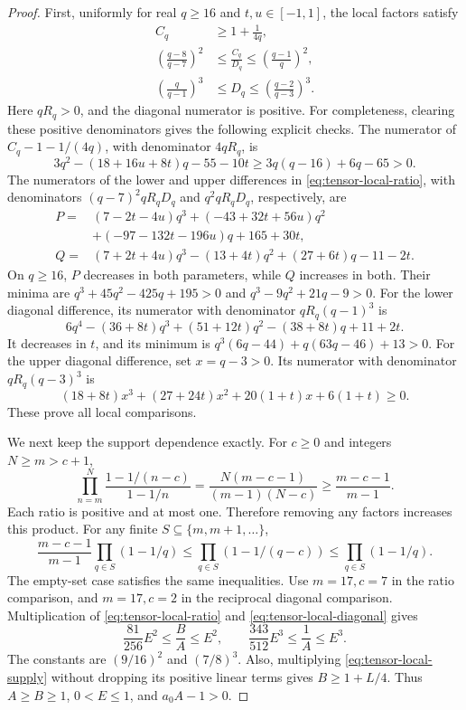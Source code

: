 \documentclass[11pt]{article}
\begin{document}
\begin{proof}
First, uniformly for real \(q\ge16\) and \(t,u\in[-1,1]\), the local factors
satisfy
\begin{align}
 C_q&\ge1+\frac1{4q}, \label{eq:tensor-local-supply}\\
 \left(\frac{q-8}{q-7}\right)^2
 &\le \frac{C_q}{D_q}\le\left(\frac{q-1}{q}\right)^2,
 \label{eq:tensor-local-ratio}\\
 \left(\frac q{q-1}\right)^3
 &\le D_q\le\left(\frac{q-2}{q-3}\right)^3 .
 \label{eq:tensor-local-diagonal}
\end{align}
Here \(qR_q>0\), and the diagonal numerator is positive.
For completeness, clearing these positive denominators gives the
following explicit checks. The numerator of
\(C_q-1-1/(4q)\), with denominator \(4qR_q\), is
\[
 3q^2-(18+16u+8t)q-55-10t
 \ge3q(q-16)+6q-65>0.
\]
The numerators of the lower and upper differences in
\eqref{eq:tensor-local-ratio}, with denominators
\((q-7)^2qR_qD_q\) and \(q^2qR_qD_q\), respectively, are
\begin{align*}
 P={}&(7-2t-4u)q^3+(-43+32t+56u)q^2\\
     &+(-97-132t-196u)q+165+30t,\\
 Q={}&(7+2t+4u)q^3-(13+4t)q^2+(27+6t)q-11-2t .
\end{align*}
On \(q\ge16\), \(P\) decreases in both parameters, while \(Q\)
increases in both. Their minima are
\(q^3+45q^2-425q+195>0\) and \(q^3-9q^2+21q-9>0\).
For the lower diagonal difference, its numerator with denominator
\(qR_q(q-1)^3\) is
\[
 6q^4-(36+8t)q^3+(51+12t)q^2-(38+8t)q+11+2t .
\]
It decreases in \(t\), and its minimum is
\(q^3(6q-44)+q(63q-46)+13>0\).
For the upper diagonal difference, set \(x=q-3>0\).
Its numerator with denominator \(qR_q(q-3)^3\) is
\[
 (18+8t)x^3+(27+24t)x^2+20(1+t)x+6(1+t)\ge0.
\]
These prove all local comparisons.

We next keep the support dependence exactly. For \(c\ge0\) and integers
\(N\ge m>c+1\),
\[
 \prod_{n=m}^{N}
 \frac{1-1/(n-c)}{1-1/n}
 =\frac{N(m-c-1)}{(m-1)(N-c)}
 \ge\frac{m-c-1}{m-1}.
\]
Each ratio is positive and at most one. Therefore removing any factors
increases this product. For any finite \(S\subseteq\{m,m+1,\ldots\}\),
\begin{equation}
 \frac{m-c-1}{m-1}\prod_{q\in S}(1-1/q)
 \le\prod_{q\in S}(1-1/(q-c))
 \le\prod_{q\in S}(1-1/q).
 \label{eq:uniform-shifted-Euler}
\end{equation}
The empty-set case satisfies the same inequalities.
Use \(m=17,c=7\) in the ratio comparison, and \(m=17,c=2\)
in the reciprocal diagonal comparison. Multiplication of
\eqref{eq:tensor-local-ratio} and \eqref{eq:tensor-local-diagonal} gives
\begin{equation}
 \frac{81}{256}E^2\le\frac BA\le E^2,\qquad
 \frac{343}{512}E^3\le\frac1A\le E^3.
 \label{eq:tensor-product-factors}
\end{equation}
The constants are \((9/16)^2\) and \((7/8)^3\).
Also, multiplying \eqref{eq:tensor-local-supply} without dropping its
positive linear terms gives \(B\ge1+L/4\).
Thus \(A\ge B\ge1\), \(0<E\le1\), and \(a_0A-1>0\).


\end{proof}
\end{document}
